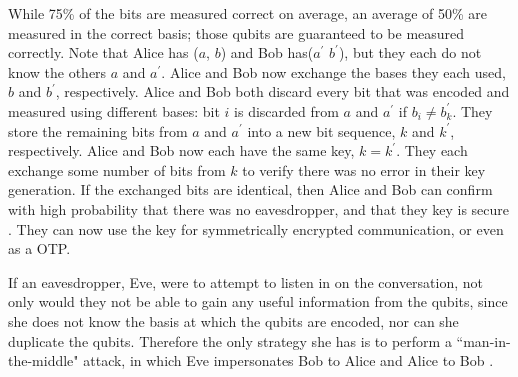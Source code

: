 While 75\% of the bits are measured correct on average, an average of 50\% are measured in the correct basis; those qubits are  guaranteed to be measured correctly.
Note that Alice has ($a$, $b$) and Bob has($a^\prime$ $b^\prime$), but they each do not know the others $a$ and $a^\prime$.
Alice and Bob now exchange the bases they each used, $b$ and $b^\prime$, respectively.
Alice and Bob both discard every bit that was encoded and measured using different bases: bit $i$ is discarded from $a$ and $a^\prime$ if $b_i \neq b^\prime_k$.
They store the remaining bits from $a$ and $a^\prime$ into a new bit sequence, $k$ and $k^\prime$, respectively.
Alice and Bob now each have the same key, $k = k^\prime$.
They each exchange some number of bits from $k$ to verify there was no error in their key generation.
If the exchanged bits are identical, then Alice and Bob can confirm with high probability that there was no eavesdropper, and that they key is secure \cite{MikeAndIke}.
They can now use the key for symmetrically encrypted communication, or even as a OTP.

If an eavesdropper, Eve, were to attempt to listen in on the conversation, not only would they not be able to gain any useful information from the qubits, since she does not know the basis at which the qubits are encoded, nor can she duplicate the qubits. 
Therefore the only strategy she has is to perform a ``man-in-the-middle" attack, in which Eve impersonates Bob to Alice and Alice to Bob \cite{qc:agi}.

